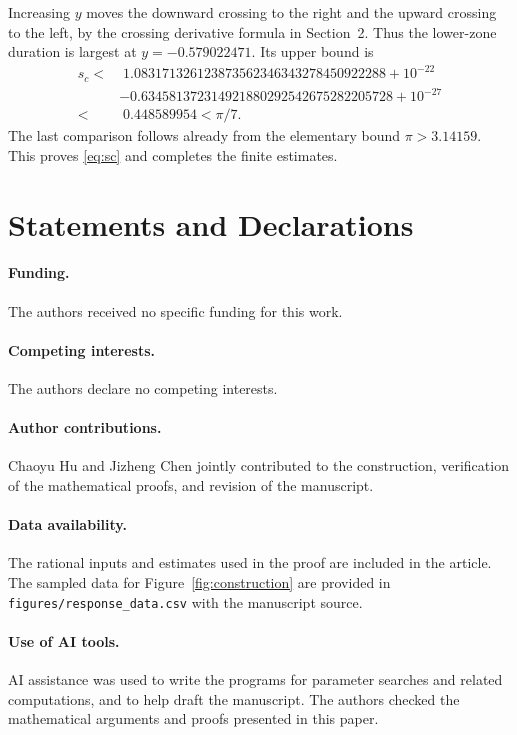 \documentclass[11pt,a4paper]{article}
\begin{document}
Increasing $y$ moves the downward crossing to the right and the upward
crossing to the left, by the crossing derivative formula in Section~2.
Thus the lower-zone duration is largest at $y=-0.579022471$. Its upper bound is
\[
\begin{split}
 s_c<&\;1.083171326123873562346343278450922288+10^{-22}\\
 &-0.634581372314921880292542675282205728+10^{-27}\\
 <&\;0.448589954<\pi/7.
\end{split}
\]
The last comparison follows already from the elementary bound
$\pi>3.14159$. This proves \eqref{eq:sc} and completes the finite estimates.

\section*{Statements and Declarations}
\paragraph{Funding.}
The authors received no specific funding for this work.
\paragraph{Competing interests.}
The authors declare no competing interests.
\paragraph{Author contributions.}
Chaoyu Hu and Jizheng Chen jointly contributed to the construction,
verification of the mathematical proofs, and revision of the manuscript.
\paragraph{Data availability.}
The rational inputs and estimates used in the proof are included in
the article. The sampled data for Figure~\ref{fig:construction} are
provided in \texttt{figures/response\_data.csv} with the manuscript source.
\paragraph{Use of AI tools.}
AI assistance was used to write the programs for parameter searches and
related computations, and to help draft the manuscript. The authors
checked the mathematical arguments and proofs presented in this paper.
\end{document}
